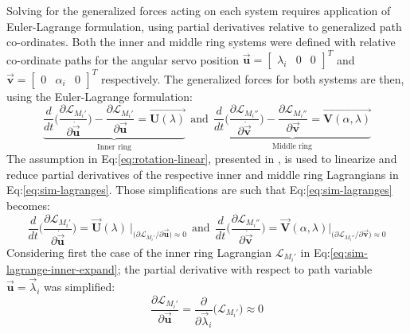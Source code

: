 Solving for the generalized forces acting on each system requires application of Euler-Lagrange formulation, using partial derivatives relative to generalized path co-ordinates. Both the inner and middle ring systems were defined with relative co-ordinate paths for the angular servo position $\vec{\mathbf{u}}=\begin{bmatrix}\lambda_i&0&0\end{bmatrix}^T$ and $\vec{\mathbf{v}}=\begin{bmatrix}0&\alpha_i&0\end{bmatrix}^T$ respectively. The generalized forces for both systems are then, using the Euler-Lagrange formulation:
\begin{equation}\label{eq:sim-lagranges}
\underbrace{\frac{d}{dt}\bigg(\frac{\partial\mathcal{L}_{M_i'}}{\partial\dot{\vec{\mathbf{u}}}}\bigg)-\frac{\partial\mathcal{L}_{M_i'}}{\partial\vec{\mathbf{u}}}=\vec{\mathbf{U}(\lambda)}}_{\text{Inner ring}}~~\text{and}~~\underbrace{\frac{d}{dt}\bigg(\frac{\partial\mathcal{L}_{M_i''}}{\partial\dot{\vec{\mathbf{v}}}}\bigg)-\frac{\partial\mathcal{L}_{M_i''}}{\partial\vec{\mathbf{v}}}=\vec{\mathbf{V}(\alpha,\lambda)}}_{\text{Middle ring}}
\end{equation}
The assumption in Eq:\ref{eq:rotation-linear}, presented in \cite{rotationlinearize}, is used to linearize and reduce partial derivatives of the respective inner and middle ring Lagrangians in Eq:\ref{eq:sim-lagranges}. Those simplifications are such that Eq:\ref{eq:sim-lagranges} becomes:
\begin{equation}\label{eq:sim-lagranges-linear}
\frac{d}{dt}\bigg(\frac{\partial\mathcal{L}_{M_i'}}{\partial\dot{\vec{\mathbf{u}}}}\bigg)=\vec{\mathbf{U}}(\lambda)~\Big|_{\big(\partial\mathcal{L}_{M_i'}/\partial\vec{\mathbf{u}}\big)\approx 0}~~\text{and}~~\frac{d}{dt}\bigg(\frac{\partial\mathcal{L}_{M_i''}}{\partial\dot{\vec{\mathbf{v}}}}\bigg)=\vec{\mathbf{V}}(\alpha,\lambda)\Big|_{\big(\partial\mathcal{L}_{M_i''}/\partial\vec{\mathbf{v}}\big)\approx 0}
\end{equation}
Considering first the case of the inner ring Lagrangian $\mathcal{L}_{M_i'}$ in Eq:\ref{eq:sim-lagrange-inner-expand}; the partial derivative with respect to path variable $\vec{\mathbf{u}}=\vec{\lambda}_i$ was simplified:
\begin{equation}\label{eq:sim-lagrange-inner-simple}
\frac{\partial\mathcal{L}_{M_i'}}{\partial\vec{\mathbf{u}}}=\frac{\partial}{\partial\vec{\lambda}_i}\big(\mathcal{L}_{M_i'}\big)\approx 0
\end{equation}

